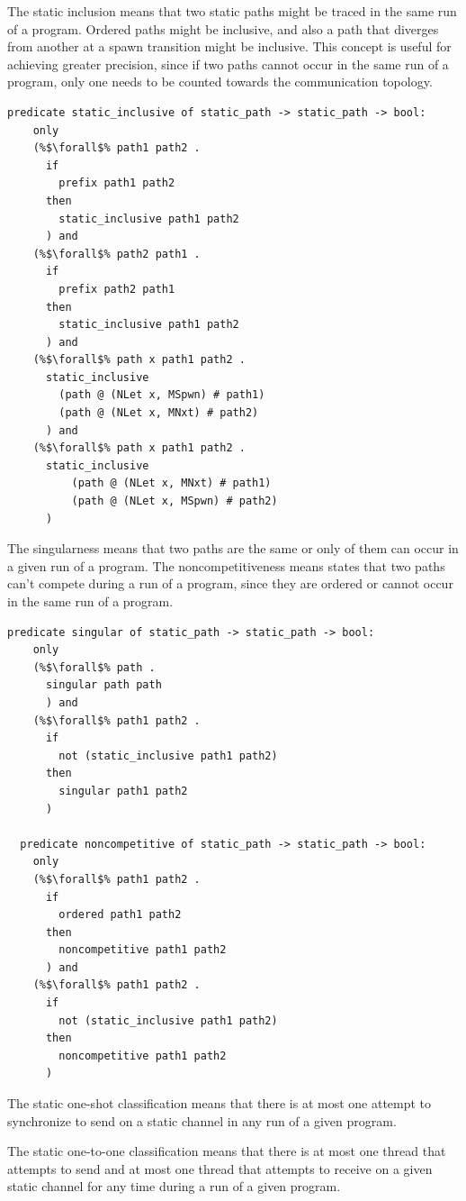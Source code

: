\documentclass{article}
\begin{document}
The static inclusion means that two static paths might be traced in
the same run of a program. Ordered paths might be inclusive, and also a path that diverges
from another at a spawn transition might be inclusive. This concept is useful for achieving
greater precision, since if two paths cannot occur in the same run of a program, only one needs
to be counted towards the communication topology. 

\begin{lstlisting}[language=logic, escapechar=\%]
  predicate static_inclusive of static_path -> static_path -> bool:
    only
    (%$\forall$% path1 path2 .
      if
        prefix path1 path2
      then
        static_inclusive path1 path2
      ) and
    (%$\forall$% path2 path1 .
      if
        prefix path2 path1
      then
        static_inclusive path1 path2
      ) and
    (%$\forall$% path x path1 path2 .
      static_inclusive
        (path @ (NLet x, MSpwn) # path1)
        (path @ (NLet x, MNxt) # path2)
      ) and
    (%$\forall$% path x path1 path2 .
      static_inclusive
          (path @ (NLet x, MNxt) # path1)
          (path @ (NLet x, MSpwn) # path2)
      )
  \end{lstlisting}


The singularness means that two paths are the same or only of them can occur in a given run of
a program. The noncompetitiveness means states that two paths can't compete during a run of a
program, since they are ordered or cannot occur in the same run of a program.

\begin{lstlisting}[language=logic, escapechar=\%]
  predicate singular of static_path -> static_path -> bool:
    only
    (%$\forall$% path .
      singular path path
      ) and
    (%$\forall$% path1 path2 .
      if
        not (static_inclusive path1 path2)
      then
        singular path1 path2
      )

  predicate noncompetitive of static_path -> static_path -> bool:
    only
    (%$\forall$% path1 path2 .
      if
        ordered path1 path2
      then
        noncompetitive path1 path2
      ) and
    (%$\forall$% path1 path2 .
      if
        not (static_inclusive path1 path2)
      then
        noncompetitive path1 path2
      )
\end{lstlisting}


The static one-shot classification means that there is at most one attempt
to synchronize to send on a static channel in any run of a given program.

The static one-to-one classification means that there is at most one thread that attempts to
send and at most one thread that attempts to receive on a given static channel for any time
during a run of a given program.
\end{document}
